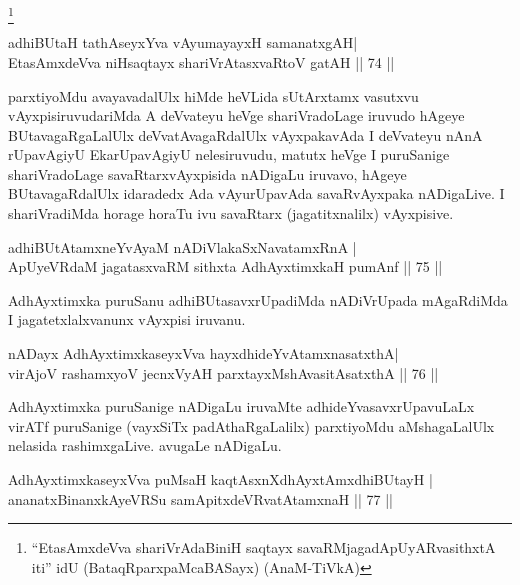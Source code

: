 \footnote{``EtasAmxdeVva shariVrAdaBiniH saqtayx savaRMjagadApUyARvasithxtA iti'' idU (BataqRparxpaMcaBASayx) (AnaM-TiVkA)}
\begin{shl}
adhiBUtaH tathA\s seyxYva vAyumayayxH samanatxgAH|\\
EtasAmxdeVva niHsaqtayx shariVrAtasxvaRtoV gatAH \hfill || 74 ||
\end{shl}

\begin{artha}
parxtiyoMdu avayavadalUlx hiMde heVLida sUtArxtamx vasutxvu vAyxpisiruvudariMda A deVvateyu heVge shariVradoLage iruvudo hAgeye BUtavagaRgaLalUlx deVvatAvagaRdalUlx vAyxpakavAda I deVvateyu nAnA rUpavAgiyU EkarUpavAgiyU nelesiruvudu, matutx heVge I puruSanige shariVradoLage savaRtarxvAyxpisida nADigaLu iruvavo, hAgeye BUtavagaRdalUlx idaradedx Ada vAyurUpavAda savaRvAyxpaka nADigaLive. I shariVradiMda horage horaTu ivu savaRtarx (jagatitxnalilx) vAyxpisive.
\end{artha}

\begin{shl}
adhiBUtAtamxneYvAyaM nADiVlakaSxNavatamxRnA |\\
ApUyeVRdaM jagatasxvaRM sithxta AdhAyxtimxkaH pumAnf \hfill || 75 || 
\end{shl}

\begin{artha}
AdhAyxtimxka puruSanu adhiBUtasavxrUpadiMda nADiVrUpada mAgaRdiMda I jagatetxlalxvanunx vAyxpisi iruvanu.
\end{artha}


\begin{shl}
nADayx AdhAyxtimxkaseyxVva hayxdhideYvAtamxnasatxthA|\\
virAjoV rashamxyoV jecnxVyAH parxtayxMshAvasitAsatxthA \hfill || 76 || 
\end{shl}

\begin{artha}
AdhAyxtimxka puruSanige nADigaLu iruvaMte adhideYvasavxrUpavuLaLx virATf puruSanige (vayxSiTx padAthaRgaLalilx) parxtiyoMdu aMshagaLalUlx nelasida rashimxgaLive. avugaLe nADigaLu.
\end{artha}

\begin{shl}
AdhAyxtimxkaseyxVva puMsaH kaqtAsxnX\s dhAyxtAmxdhiBUtayH |\\
ananatxBinanxkAyeVRSu samApitxdeVRvatAtamxnaH \hfill || 77 || 
\end{shl}

